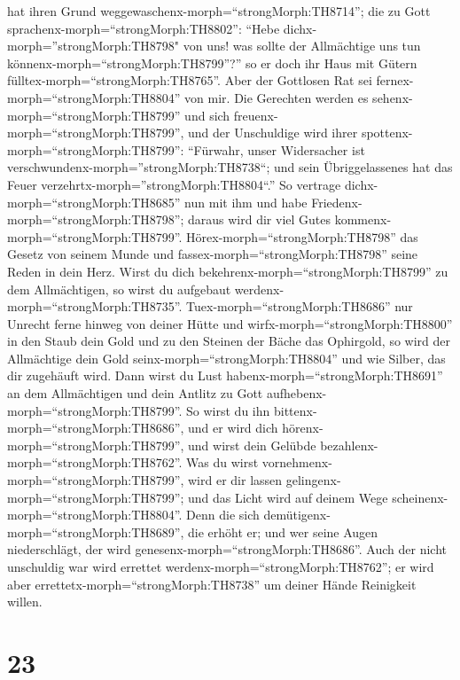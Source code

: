 hat ihren Grund weggewaschenx-morph=``strongMorph:TH8714'';
 die zu Gott sprachenx-morph=``strongMorph:TH8802'': ``Hebe
dichx-morph=''strongMorph:TH8798" von uns! was sollte der Allmächtige
uns tun könnenx-morph=``strongMorph:TH8799''?''  so er doch
ihr Haus mit Gütern fülltex-morph=``strongMorph:TH8765''. Aber der
Gottlosen Rat sei fernex-morph=``strongMorph:TH8804'' von mir.
 Die Gerechten werden es
sehenx-morph=``strongMorph:TH8799'' und sich
freuenx-morph=``strongMorph:TH8799'', und der Unschuldige wird ihrer
spottenx-morph=``strongMorph:TH8799'':  ``Fürwahr, unser
Widersacher ist verschwundenx-morph=''strongMorph:TH8738``; und sein
Übriggelassenes hat das Feuer verzehrtx-morph=''strongMorph:TH8804``.''
 So vertrage dichx-morph=``strongMorph:TH8685'' nun mit ihm
und habe Friedenx-morph=``strongMorph:TH8798''; daraus wird dir viel
Gutes kommenx-morph=``strongMorph:TH8799''. 
Hörex-morph=``strongMorph:TH8798'' das Gesetz von seinem Munde und
fassex-morph=``strongMorph:TH8798'' seine Reden in dein Herz.
 Wirst du dich bekehrenx-morph=``strongMorph:TH8799'' zu
dem Allmächtigen, so wirst du aufgebaut
werdenx-morph=``strongMorph:TH8735''. Tuex-morph=``strongMorph:TH8686''
nur Unrecht ferne hinweg von deiner Hütte  und
wirfx-morph=``strongMorph:TH8800'' in den Staub dein Gold und zu den
Steinen der Bäche das Ophirgold,  so wird der Allmächtige
dein Gold seinx-morph=``strongMorph:TH8804'' und wie Silber, das dir
zugehäuft wird.  Dann wirst du Lust
habenx-morph=``strongMorph:TH8691'' an dem Allmächtigen und dein Antlitz
zu Gott aufhebenx-morph=``strongMorph:TH8799''.  So wirst
du ihn bittenx-morph=``strongMorph:TH8686'', und er wird dich
hörenx-morph=``strongMorph:TH8799'', und wirst dein Gelübde
bezahlenx-morph=``strongMorph:TH8762''.  Was du wirst
vornehmenx-morph=``strongMorph:TH8799'', wird er dir lassen
gelingenx-morph=``strongMorph:TH8799''; und das Licht wird auf deinem
Wege scheinenx-morph=``strongMorph:TH8804''.  Denn die sich
demütigenx-morph=``strongMorph:TH8689'', die erhöht er; und wer seine
Augen niederschlägt, der wird genesenx-morph=``strongMorph:TH8686''.
 Auch der nicht unschuldig war wird errettet
werdenx-morph=``strongMorph:TH8762''; er wird aber
errettetx-morph=``strongMorph:TH8738'' um deiner Hände Reinigkeit
willen.

\hypertarget{section-22}{%
\section{23}\label{section-22}}

